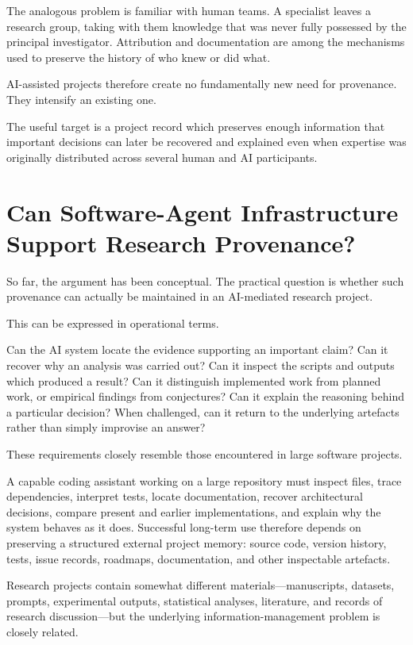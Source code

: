 The analogous problem is familiar with human teams. A specialist leaves a research group, taking with them knowledge that was never fully possessed by the principal investigator. Attribution and documentation are among the mechanisms used to preserve the history of who knew or did what.

AI-assisted projects therefore create no fundamentally new need for provenance. They intensify an existing one.

The useful target is a project record which preserves enough information that important decisions can later be recovered and explained even when expertise was originally distributed across several human and AI participants.


\section{Can Software-Agent Infrastructure Support Research Provenance?}

So far, the argument has been conceptual. The practical question is whether such provenance can actually be maintained in an AI-mediated research project.

This can be expressed in operational terms.

Can the AI system locate the evidence supporting an important claim? Can it recover why an analysis was carried out? Can it inspect the scripts and outputs which produced a result? Can it distinguish implemented work from planned work, or empirical findings from conjectures? Can it explain the reasoning behind a particular decision? When challenged, can it return to the underlying artefacts rather than simply improvise an answer?

These requirements closely resemble those encountered in large software projects.

A capable coding assistant working on a large repository must inspect files, trace dependencies, interpret tests, locate documentation, recover architectural decisions, compare present and earlier implementations, and explain why the system behaves as it does. Successful long-term use therefore depends on preserving a structured external project memory: source code, version history, tests, issue records, roadmaps, documentation, and other inspectable artefacts.

Research projects contain somewhat different materials---manuscripts, datasets, prompts, experimental outputs, statistical analyses, literature, and records of research discussion---but the underlying information-management problem is closely related.

